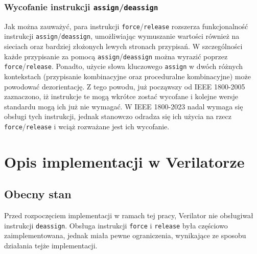 \documentclass[shortabstract, inz]{iithesis}
\begin{document}
\subsection{Wycofanie instrukcji \texttt{assign}/\texttt{deassign}}
\label{sec:deassign-deprecation}
\medskip
Jak można zauważyć, para instrukcji \texttt{force}/\texttt{release} rozszerza funkcjonalność instrukcji \texttt{assign}/\texttt{deassign}, umożliwiając wymuszanie wartości również na sieciach oraz bardziej złożonych lewych stronach przypisań. W szczególności każde przypisanie za pomocą \texttt{assign}/\texttt{deassign} można wyrazić poprzez \texttt{force}/\texttt{release}. Ponadto, użycie słowa kluczowego \texttt{assign} w dwóch różnych kontekstach (przypisanie kombinacyjne oraz proceduralne kombinacyjne) może powodować dezorientację. Z tego powodu, już począwszy od IEEE 1800-2005\cite{IEEE1800-2005} zaznaczono, iż instrukcje te mogą wkrótce zostać wycofane i kolejne wersje standardu mogą ich już nie wymagać. W IEEE 1800-2023\cite{IEEE1800-2023} nadal wymaga się obsługi tych instrukcji, jednak stanowczo odradza się ich użycia na rzecz \texttt{force}/\texttt{release} i wciąż rozważane jest ich wycofanie.



\chapter{Opis implementacji w Verilatorze}
\section{Obecny stan}
Przed rozpoczęciem implementacji w ramach tej pracy, Verilator nie obsługiwał instrukcji \texttt{deassign}. Obsługa instrukcji \texttt{force} i \texttt{release} była częściowo zaimplementowana, jednak miała pewne ograniczenia, wynikające ze sposobu działania tejże implementacji.
\end{document}
